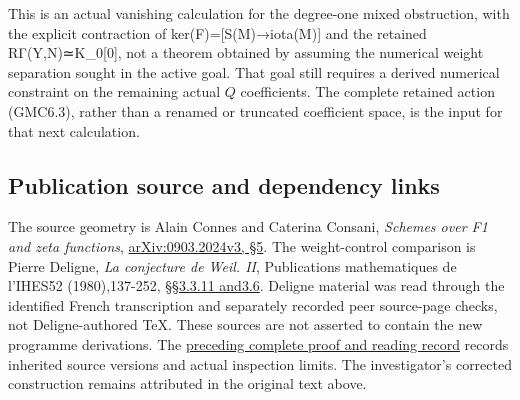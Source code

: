 This is an actual vanishing calculation for the degree-one mixed
obstruction, with the explicit contraction of ker(F)={[}S(M)→iota(M){]}
and the retained RΓ(Y,N)≃K\_0{[}0{]}, not a theorem obtained by assuming
the numerical weight separation sought in the active goal. That goal
still requires a derived numerical constraint on the remaining actual
\(Q\) coefficients. The complete retained action (GMC6.3), rather than a
renamed or truncated coefficient space, is the input for that next
calculation.

\subsection{Publication source and dependency
links}\label{publication-source-and-dependency-links}

The source geometry is Alain Connes and Caterina Consani, \emph{Schemes
over F1 and zeta functions},
\href{https://arxiv.org/abs/0903.2024v3}{arXiv:0903.2024v3, §5}. The
weight-control comparison is Pierre Deligne, \emph{La conjecture de
Weil. II}, Publications mathematiques de l'IHES52 (1980),137-252,
\href{https://www.numdam.org/item/PMIHES_1980__52__137_0/}{§§3.3.11
and3.6}. Deligne material was read through the identified French
transcription and separately recorded peer source-page checks, not
Deligne-authored TeX. These sources are not asserted to contain the new
programme derivations. The
\href{https://github.com/KokunoYumeto/zeta-function-research-reader/blob/36a82ecca98addb8a98b48204e349737856c7223/workbenches/splitzero-tandem/continuations/20260924-cohomology-weight-and-character-lifts/BUILD_AND_REVIEW.md}{preceding
complete proof and reading record} records inherited source versions and
actual inspection limits. The investigator's corrected construction
remains attributed in the original text above.
